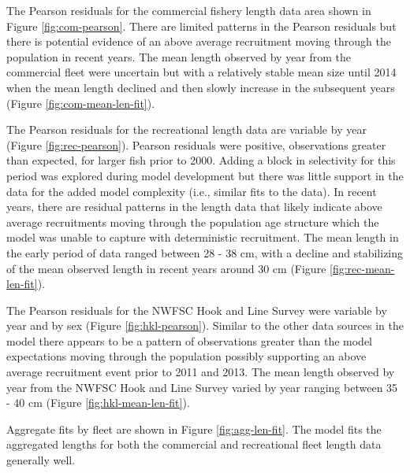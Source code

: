 \documentclass[11pt,
  english,
  a4paper,
]{article}
\begin{document}
The Pearson residuals for the commercial fishery length data area shown in Figure \ref{fig:com-pearson}. There are limited patterns in the Pearson residuals but there is potential evidence of an above average recruitment moving through the population in recent years. The mean length observed by year from the commercial fleet were uncertain but with a relatively stable mean size until 2014 when the mean length declined and then slowly increase in the subsequent years (Figure \ref{fig:com-mean-len-fit}).

\leavevmode\tagmcend\tagstructend\par


The Pearson residuals for the recreational length data are variable by year (Figure \ref{fig:rec-pearson}). Pearson residuals were positive, observations greater than expected, for larger fish prior to 2000. Adding a block in selectivity for this period was explored during model development but there was little support in the data for the added model complexity (i.e., similar fits to the data). In recent years, there are residual patterns in the length data that likely indicate above average recruitments moving through the population age structure which the model was unable to capture with deterministic recruitment. The mean length in the early period of data ranged between 28 - 38 cm, with a decline and stabilizing of the mean observed length in recent years around 30 cm (Figure \ref{fig:rec-mean-len-fit}).

\leavevmode\tagmcend\tagstructend\par


The Pearson residuals for the NWFSC Hook and Line Survey were variable by year and by sex (Figure \ref{fig:hkl-pearson}). Similar to the other data sources in the model there appears to be a pattern of observations greater than the model expectations moving through the population possibly supporting an above average recruitment event prior to 2011 and 2013. The mean length observed by year from the NWFSC Hook and Line Survey varied by year ranging between 35 - 40 cm (Figure \ref{fig:hkl-mean-len-fit}).

\leavevmode\tagmcend\tagstructend\par


Aggregate fits by fleet are shown in Figure \ref{fig:agg-len-fit}. The model fits the aggregated lengths for both the commercial and recreational fleet length data generally well.
\end{document}
